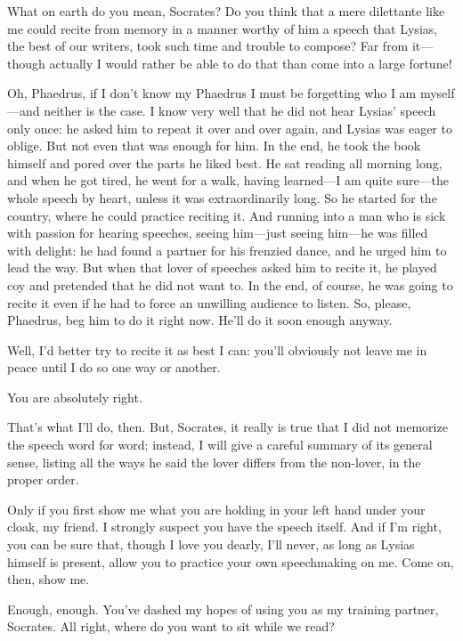 \sayphaedrus What on earth do you mean, Socrates? Do you think that a 
mere dilettante like me could recite from memory in a
manner worthy of him a speech that Lysias, the best of our writers, took
such time and trouble to compose? Far from it---though actually I would
rather be able to do that than come into a large fortune!

\saysocrates Oh, Phaedrus, if I don't know my Phaedrus I must be forgetting
who I am myself---and neither is the case. I know very well that he did
not hear Lysias' speech only once: he asked him to repeat it over and
over again, and Lysias was eager to oblige. But not even that was enough
for him. In the end, he took the book himself and pored over the
parts he liked best. He sat reading all morning long, and when he got
tired, he went for a walk, having learned---I am quite sure---the whole
speech by heart, unless it was extraordinarily long. So he started for
the country, where he could practice reciting it. And running into a man
who is sick with passion for hearing speeches, seeing him---just seeing
him---he was filled with delight: he had found a partner for his
frenzied dance, and he urged him to lead the way. But when that
lover of speeches asked him to recite it, he played coy and pretended
that he did not want to. In the end, of course, he was going to recite
it even if he had to force an unwilling audience to listen. So, please,
Phaedrus, beg him to do it right now. He'll do it soon enough anyway.

\sayphaedrus Well, I'd better try to recite it as best I can: you'll
obviously not leave me in peace until I do so one way or another.

\saysocrates You are absolutely right.

\sayphaedrus That's what I'll do, then. But, Socrates, it really is true
that I did not memorize the speech word for word; instead, I
will give a careful summary of its general sense, listing all the ways
he said the lover differs from the non-lover, in the proper order.

\saysocrates Only if you first show me what you are holding in your left
hand under your cloak, my friend. I strongly suspect you have the speech
itself. And if I'm right, you can be sure that, though I love you
dearly, I'll never, as long as Lysias himself is present, allow you to
practice your own speechmaking on me. Come on, then, show me.

\sayphaedrus Enough, enough. You've dashed my hopes of using you as my
training partner, Socrates. All right, where do you want to sit while we
read?

